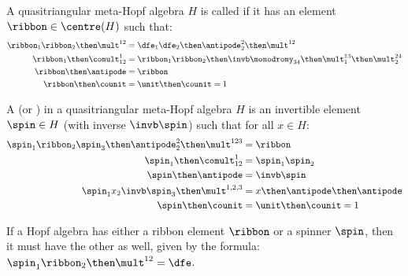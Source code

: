\begin{definition}
        A quasitriangular meta-Hopf algebra $H$ is called  if it has an
        element $\ribbon\in \centre(H)$ such that:
        \begin{align}
                \ribbon_1\ribbon_2\then\mult^{12}
                &= \dfe_1 \dfe_2 \then \antipode^{2}_{2} \then \mult^{12}\\
                \ribbon_1 \then \comult^1_{12}
                &=      \ribbon_1\ribbon_2
                        \then\invb\monodromy_{34}
                        \then\mult^{13}_{1}
                        \then\mult^{24}_{2} \\
                \ribbon \then \antipode &= \ribbon\\
                \ribbon \then \counit &= \unit \then \counit = 1
        \end{align}
\end{definition}

\begin{definition}
        A  (or ) in a
        quasitriangular meta-Hopf algebra $H$ is an invertible element
        $\spin\in H$ (with inverse $\invb\spin$) such that for all $x\in H$:
        \begin{align}
                \label{eq:spinner_ribbon}
                \spin_1\ribbon_2\spin_3 \then \antipode^2_2 \then \mult^{123} &=
                \ribbon\\
                \label{eq:spinner_comult}
                \spin_1\then\comult^{1}_{12} &=\spin_1\spin_2\\
                \label{eq:spinner_antipode}
                \spin \then\antipode &= \invb\spin\\
                \label{eq:spinner_conjugate}
                \spin_{1}x_2\invb\spin_{3}\then\mult^{1,2,3} &=
                x \then \antipode \then \antipode\\
                \label{eq:spinner_counit}
                \spin \then \counit &= \unit \then \counit = 1
        \end{align}
\end{definition}

\begin{lemma}\label{lem:spinner_ribbon}
        If a Hopf algebra has either a ribbon element $\ribbon$ or a spinner
        $\spin$, then it must have the other as well, given by the formula:
        $\spin_1 \ribbon_2 \then \mult^{12} = \dfe$.
\end{lemma}


